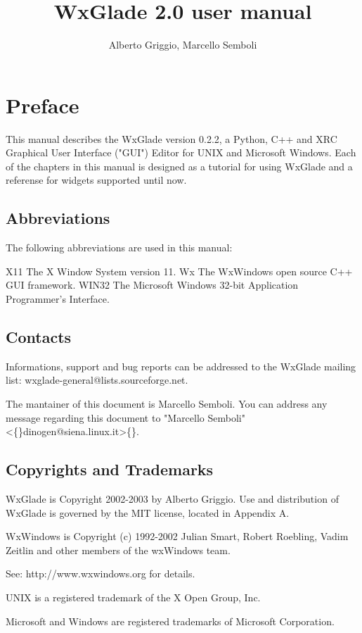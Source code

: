 \documentclass[a4paper,10pt]{report}
\title{WxGlade 2.0 user manual}
\author{Alberto Griggio, Marcello Semboli}
\begin{document}
  \maketitle
  \tableofcontents

  \chapter{Preface}
  This manual describes the WxGlade version 0.2.2, a Python,  C++
  and XRC Graphical User Interface ("GUI") Editor for UNIX and
  Microsoft Windows. Each of the chapters in this manual is designed
  as a tutorial for using WxGlade and a referense for widgets
  supported until now.


  \section{Abbreviations}
  The following abbreviations are used in this manual:

  X11
  The X Window System version 11.
  Wx
  The WxWindows open source C++ GUI framework.
  WIN32
  The Microsoft Windows 32-bit Application Programmer's Interface.

  \section{Contacts}
  Informations, support and bug reports can be addressed to the
  WxGlade mailing list:
  wxglade-general@lists.sourceforge.net.

  The mantainer of this document is Marcello Semboli.
  You can address any message regarding this document to "Marcello
  Semboli" \textless\{\}dinogen@siena.linux.it\textgreater\{\}.

  \section{Copyrights and Trademarks}
  WxGlade is Copyright 2002-2003 by Alberto Griggio. Use and distribution
  of WxGlade is governed by the MIT license, located in Appendix
  A.

  WxWindows is Copyright (c) 1992-2002 Julian Smart, Robert Roebling,
  Vadim Zeitlin and other members of the wxWindows team.


  See: http://www.wxwindows.org for details.



  UNIX is a registered trademark of the X Open Group, Inc.

  Microsoft and Windows are registered trademarks of Microsoft
  Corporation.
\end{document}
